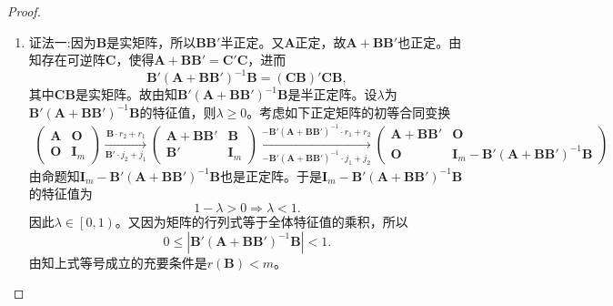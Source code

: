 \documentclass[../../main.tex]{subfiles}%
\begin{document}
\begin{proof}
\begin{enumerate}[(1)]
\item {\color{blue}证法一:}因为$\boldsymbol{B}$是实矩阵，所以$\boldsymbol{BB}'$半正定。又$\boldsymbol{A}$正定，故$\boldsymbol{A}+\boldsymbol{BB}'$也正定。由知存在可逆阵$\boldsymbol{C}$，使得$\boldsymbol{A}+\boldsymbol{BB}'=\boldsymbol{C}'\boldsymbol{C}$，进而
$$\boldsymbol{B}'\left( \boldsymbol{A}+\boldsymbol{BB}' \right) ^{-1}\boldsymbol{B}=\left( \boldsymbol{CB} \right) '\boldsymbol{CB},$$
其中$\boldsymbol{CB}$是实矩阵。故由知$\boldsymbol{B}'\left( \boldsymbol{A}+\boldsymbol{BB}' \right) ^{-1}\boldsymbol{B}$是半正定阵。设$\lambda$为$\boldsymbol{B}'\left( \boldsymbol{A}+\boldsymbol{BB}' \right) ^{-1}\boldsymbol{B}$的特征值，则$\lambda \geqslant 0$。考虑如下正定矩阵的初等合同变换
\begin{align*}
\begin{pmatrix} 
\boldsymbol{A} & \boldsymbol{O} \\ 
\boldsymbol{O} & \boldsymbol{I}_m 
\end{pmatrix} 
\xrightarrow[\boldsymbol{B}' \cdot j_2 + j_1]{\boldsymbol{B} \cdot r_2 + r_1} 
\begin{pmatrix} 
\boldsymbol{A} + \boldsymbol{BB}' & \boldsymbol{B} \\ 
\boldsymbol{B}' & \boldsymbol{I}_m 
\end{pmatrix} 
\xrightarrow[-\boldsymbol{B}'(\boldsymbol{A} + \boldsymbol{BB}')^{-1} \cdot j_1 + j_2]{-\boldsymbol{B}'(\boldsymbol{A} + \boldsymbol{BB}')^{-1} \cdot r_1 + r_2} 
\begin{pmatrix} 
\boldsymbol{A} + \boldsymbol{BB}' & \boldsymbol{O} \\ 
\boldsymbol{O} & \boldsymbol{I}_m - \boldsymbol{B}'(\boldsymbol{A} + \boldsymbol{BB}')^{-1}\boldsymbol{B} 
\end{pmatrix}
\end{align*}
由命题知$\boldsymbol{I}_m-\boldsymbol{B}'\left( \boldsymbol{A}+\boldsymbol{BB}' \right) ^{-1}\boldsymbol{B}$也是正定阵。于是$\boldsymbol{I}_m-\boldsymbol{B}'\left( \boldsymbol{A}+\boldsymbol{BB}' \right) ^{-1}\boldsymbol{B}$的特征值为
$$1-\lambda >0\Longrightarrow \lambda <1.$$
因此$\lambda \in \left[ 0,1 \right)$。又因为矩阵的行列式等于全体特征值的乘积，所以
$$0\leqslant \left| \boldsymbol{B}'\left( \boldsymbol{A}+\boldsymbol{BB}' \right) ^{-1}\boldsymbol{B} \right|<1.$$
由知上式等号成立的充要条件是$r\left( \boldsymbol{B} \right) <m$。


\end{enumerate}
\end{proof}
\end{document}
